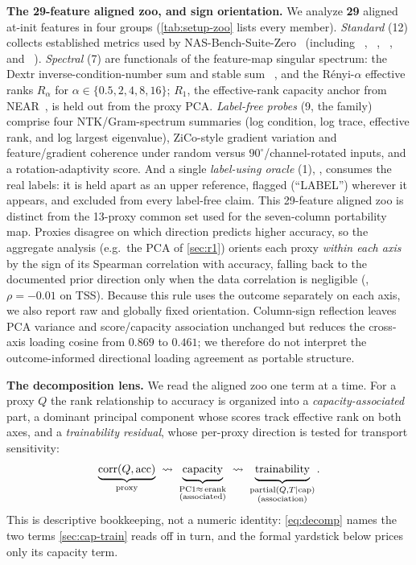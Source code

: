 \textbf{The 29-feature aligned zoo, and sign orientation.}
We analyze \textbf{29} aligned at-init features in four groups
(\cref{tab:setup-zoo} lists every member). \emph{Standard} (12) collects
established metrics used by NAS-Bench-Suite-Zero~\cite{krishnakumar2022nbsz} (including
~\cite{li2023zico}, ~\cite{jiang2023meco},
~\cite{lin2021zen}, and ~\cite{chen2021tenas}).
\emph{Spectral} (7) are functionals of the feature-map singular
spectrum: the Dextr inverse-condition-number sum  and stable sum
~\cite{dextr2025}, and the R\'enyi-$\alpha$ effective ranks
$R_\alpha$ for $\alpha\in\{0.5,2,4,8,16\}$; $R_1$, the effective-rank
capacity anchor from NEAR~\cite{near2025}, is held out from the proxy PCA.
\emph{Label-free probes} (9, the  family) comprise four NTK/Gram-spectrum
summaries (log condition, log trace, effective rank, and log largest eigenvalue),
ZiCo-style gradient variation and feature/gradient coherence under random versus
$90^\circ$/channel-rotated inputs, and a rotation-adaptivity score.
And a single \emph{label-using oracle} (1), , consumes the real
labels: it is held apart as an upper reference, flagged (``LABEL'') wherever it
appears, and excluded from every label-free claim. This 29-feature aligned zoo is
distinct from the 13-proxy common set used for the seven-column portability map.
Proxies disagree on which direction predicts higher accuracy, so the aggregate
analysis (e.g.\ the PCA of \cref{sec:r1}) orients each proxy
\emph{within each axis} by the sign of
its Spearman correlation with accuracy, falling back to the documented prior
direction only when the data correlation is negligible (, $\rho=-0.01$
on TSS). Because this rule uses the outcome separately on each axis, we also
report raw and globally fixed orientation. Column-sign reflection
leaves PCA variance and score/capacity association unchanged but reduces the
cross-axis loading cosine from $0.869$ to $0.461$; we therefore do not interpret
the outcome-informed directional loading agreement as portable structure.
\label{sec:setup-orient}

\textbf{The decomposition lens.}
We read the aligned zoo one term at a time. For a proxy $Q$ the rank relationship
to accuracy is organized into a \emph{capacity-associated} part, a dominant
principal component whose scores track effective rank on both axes, and a
\emph{trainability residual}, whose per-proxy direction is tested for transport
sensitivity:
\begin{equation}
\label{eq:decomp}
\displaystyle
\underbrace{\operatorname{corr}(Q,\mathrm{acc})}_{\text{proxy}}
\;\rightsquigarrow\;
\underbrace{\vphantom{\big|}\text{capacity}}_{\substack{\text{PC1}{\approx}\operatorname{erank}\\ \text{(associated)}}}
\;\rightsquigarrow\;
\underbrace{\vphantom{\big|}\text{trainability}}_{\substack{\operatorname{partial}(Q,T\mid\mathrm{cap})\\ \text{(association)}}}.
\end{equation}
This is descriptive bookkeeping, not a numeric identity: \cref{eq:decomp} names the
two terms \cref{sec:cap-train} reads off in turn, and the formal yardstick below
prices only its capacity term.

